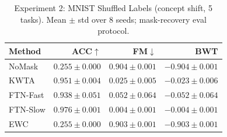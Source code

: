 \begin{table}[h]
\centering
\caption{Experiment 2: MNIST Shuffled Labels (concept shift, 5 tasks).  Mean $\pm$ std over 8 seeds; mask-recovery eval protocol.}
\label{tab:exp2}
\begin{tabular}{l rrr}
\toprule
Method & ACC$\uparrow$ & FM$\downarrow$ & BWT \\
\midrule
NoMask & $0.255\pm0.000$ & $0.904\pm0.001$ & $-0.904\pm0.001$ \\
KWTA & $0.951\pm0.004$ & $0.025\pm0.005$ & $-0.023\pm0.006$ \\
FTN-Fast & $0.938\pm0.051$ & $0.052\pm0.064$ & $-0.052\pm0.064$ \\
FTN-Slow & $0.976\pm0.001$ & $0.004\pm0.001$ & $-0.004\pm0.001$ \\
EWC & $0.255\pm0.000$ & $0.903\pm0.001$ & $-0.903\pm0.001$ \\
\bottomrule
\end{tabular}
\end{table}
